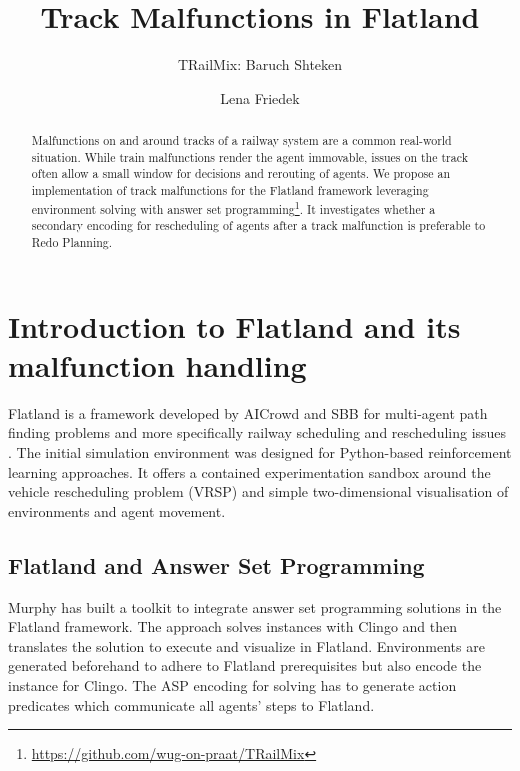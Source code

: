 \documentclass[runningheads]{llncs}
\begin{document}
%
\title{Track Malfunctions in Flatland}
%
%
\author{TRailMix: Baruch Shteken \and
Lena Friedek}
%
%
%
\maketitle              %
%
\begin{abstract}
Malfunctions on and around tracks of a railway system are a common real-world situation. While train malfunctions render the agent immovable, issues on the track often allow a small window for decisions and rerouting of agents. We propose an implementation of track malfunctions for the Flatland framework leveraging environment solving with answer set programming\footnote{\url{https://github.com/wug-on-praat/TRailMix}}. It investigates whether a secondary encoding for rescheduling of agents after a track malfunction is preferable to Redo Planning. 

\end{abstract}


\section{Introduction to Flatland and its malfunction handling}
Flatland is a framework developed by AICrowd and SBB for multi-agent path finding problems and more specifically railway scheduling and rescheduling issues \cite{mohanty2020}. The initial simulation environment was designed for Python-based reinforcement learning approaches. It offers a contained experimentation sandbox around the vehicle rescheduling problem (VRSP) and simple two-dimensional visualisation of environments and agent movement.



\subsection{Flatland and Answer Set Programming}
Murphy \cite{Murphy2026a} has built a toolkit to integrate answer set programming solutions in the Flatland framework. The approach solves instances with Clingo \cite{gebser2018clingo} and then translates the solution to execute and visualize in Flatland. Environments are generated beforehand to adhere to Flatland prerequisites but also encode the instance for Clingo. The ASP encoding for solving has to generate action predicates which communicate all agents' steps to Flatland.  
\end{document}
